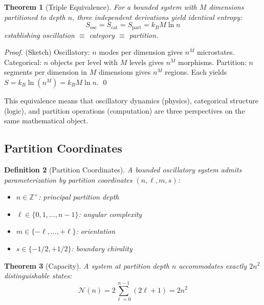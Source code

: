 \documentclass[twocolumn,10pt]{article}
\newtheorem{theorem}{Theorem}[section]
\newtheorem{definition}[theorem]{Definition}
\theoremstyle{remark}
\begin{document}
\begin{theorem}[Triple Equivalence]
\label{thm:triple}
For a bounded system with $M$ dimensions partitioned to depth $n$, three independent derivations yield identical entropy:
\begin{equation}
S_{\text{osc}} = S_{\text{cat}} = S_{\text{part}} = k_B M \ln n
\end{equation}
establishing oscillation $\equiv$ category $\equiv$ partition.
\end{theorem}

\begin{proof}
(Sketch) Oscillatory: $n$ modes per dimension gives $n^M$ microstates. Categorical: $n$ objects per level with $M$ levels gives $n^M$ morphisms. Partition: $n$ segments per dimension in $M$ dimensions gives $n^M$ regions. Each yields $S = k_B \ln(n^M) = k_B M \ln n$. \qed
\end{proof}

This equivalence means that oscillatory dynamics (physics), categorical structure (logic), and partition operations (computation) are three perspectives on the same mathematical object.

\subsection{Partition Coordinates}

\begin{definition}[Partition Coordinates]
A bounded oscillatory system admits parameterization by partition coordinates $(n, \ell, m, s)$:
\begin{itemize}
    \item $n \in \mathbb{Z}^+$: principal partition depth
    \item $\ell \in \{0, 1, \ldots, n-1\}$: angular complexity
    \item $m \in \{-\ell, \ldots, +\ell\}$: orientation
    \item $s \in \{-1/2, +1/2\}$: boundary chirality
\end{itemize}
\end{definition}

\begin{theorem}[Capacity]
\label{thm:capacity}
A system at partition depth $n$ accommodates exactly $2n^2$ distinguishable states:
\begin{equation}
\mathcal{N}(n) = 2\sum_{\ell=0}^{n-1}(2\ell+1) = 2n^2
\end{equation}
\end{theorem}
\end{document}
